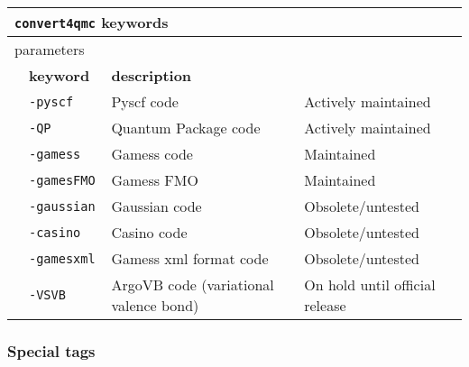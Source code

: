 \begin{table}[h]
\begin{center}
\begin{tabularx}{\textwidth}{l l l l }
\hline
\multicolumn{4}{l}{\texttt{convert4qmc} keywords} \\
\hline
\multicolumn{2}{l}{parameters}  & \multicolumn{2}{l}{}\\
   &   \bfseries keyword      &\bfseries description \\
   &   \texttt{-pyscf       } &  Pyscf code & Actively maintained\\
   &   \texttt{-QP          } &  Quantum Package code & Actively maintained\\
   &   \texttt{-gamess      } &  Gamess code & Maintained\\
   &   \texttt{-gamesFMO    } &  Gamess FMO & Maintained\\
   &   \texttt{-gaussian    } &  Gaussian code & Obsolete/untested \\
   &   \texttt{-casino      } &  Casino code & Obsolete/untested \\
   &   \texttt{-gamesxml    } &  Gamess xml format code  & Obsolete/untested\\
   &   \texttt{-VSVB        } &  ArgoVB code (variational valence bond) & On hold until official release\\
    \hline

    \end{tabularx}
\end{center}
\end{table}

\subsubsection{Special tags}

